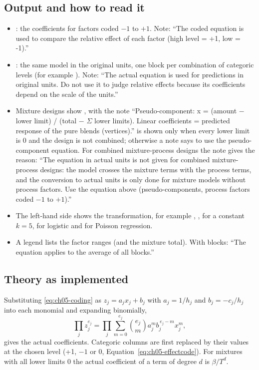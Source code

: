 \subsection*{Output and how to read it}
\begin{itemize}
  \item {}: the coefficients for factors coded $-1$ to $+1$. Note: ``The coded
        equation is used to compare the relative effect of each factor (high level = +1, low = -1).''
  \item {}: the same model in the original units, one block per combination of
        categoric levels (for example ). Note: ``The actual
        equation is used for predictions in original units. Do not use it to judge relative effects
        because its coefficients depend on the scale of the units.''
  \item Mixture designs show , with the note ``Pseudo-component: x = (amount
        $-$ lower limit) / (total $-$ $\Sigma$ lower limits). Linear coefficients = predicted response
        of the pure blends (vertices).''  is shown only when every lower limit is
        0 and the design is not combined; otherwise a note says to use the pseudo-component equation. For
        combined mixture-process designs the note gives the reason: ``The equation in actual units is not
        given for combined mixture-process designs: the model crosses the mixture terms with the process
        terms, and the conversion to actual units is only done for mixture models without process factors.
        Use the equation above (pseudo-components, process factors coded $-1$ to $+1$).''
  \item The left-hand side shows the transformation, for example , ,
         for a constant $k=5$,  for logistic and
         for Poisson regression.
  \item A legend lists the factor ranges (and the mixture total). With blocks: ``The equation applies to
        the average of all blocks.''
\end{itemize}

\subsection*{Theory as implemented}
Substituting \eqref{eq:ch05-coding} as $z_j=a_jx_j+b_j$ with $a_j=1/h_j$ and $b_j=-c_j/h_j$ into each
monomial and expanding binomially,
\begin{equation}
  \prod_j z_j^{e_j}=\prod_j\sum_{m=0}^{e_j}\binom{e_j}{m}a_j^{m}b_j^{\,e_j-m}x_j^{m},
  \label{eq:ch05-coded2actual}
\end{equation}
gives the actual coefficients. Categoric columns are first replaced by their values at the chosen level
(+1, $-1$ or 0, Equation~\ref{eq:ch05-effectcode}). For mixtures with all lower limits 0 the actual
coefficient of a term of degree $d$ is $\beta/T^{d}$.

